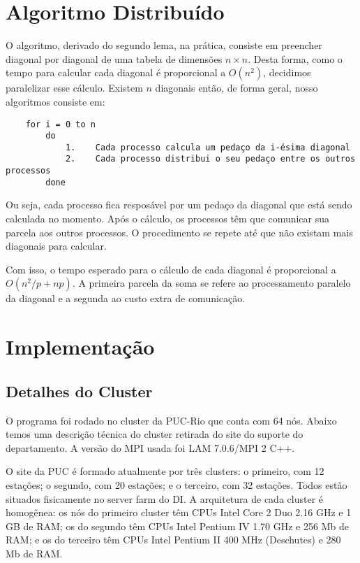 \documentclass[12pt]{article}
\begin{document}
\section{Algoritmo Distribuído}

O algoritmo, derivado do segundo lema,
na prática, consiste em preencher
diagonal por diagonal de uma tabela de dimensões
$n \times n$. Desta forma, como o tempo para calcular cada diagonal
é proporcional a $O(n^2)$, decidimos paralelizar esse cálculo.
Existem $n$ diagonais então, de forma geral, nosso
algoritmos consiste em:

\begin{verbatim}
	for i = 0 to n
		do
			1.    Cada processo calcula um pedaço da i-ésima diagonal
			2.    Cada processo distribui o seu pedaço entre os outros processos
		done
\end{verbatim}

Ou seja, cada processo fica resposável por um pedaço
da diagonal que está sendo calculada no momento. Após o cálculo,
os processos têm que comunicar sua parcela aos outros processos. 
O procedimento se repete até que não existam mais diagonais para calcular.

Com isso, o tempo esperado para o cálculo de cada diagonal é proporcional a
$O(n^2/p + np)$. A primeira parcela da soma se refere ao 
processamento paralelo da diagonal e a segunda ao custo
extra de comunicação.


\section{Implementação}

\subsection{Detalhes do Cluster}
O programa foi rodado no cluster da PUC-Rio que 
conta com 64 nós. Abaixo temos uma descrição técnica 
do cluster retirada do site do suporte do departamento.
A versão do MPI usada foi LAM 7.0.6/MPI 2 C++.

O site da PUC é formado atualmente por três clusters: o primeiro, com 12 estações;
o segundo, com 20 estações; e o terceiro, com 32 estações.
Todos estão situados fisicamente no server farm do DI.
A arquitetura de cada cluster é homogênea: os nós do primeiro cluster têm CPUs Intel Core 2 Duo 2.16 GHz e 1 GB de RAM;
os do segundo têm CPUs Intel Pentium IV 1.70 GHz e 256 Mb de RAM;
e os do terceiro têm CPUs Intel Pentium II 400 MHz (Deschutes) e 280 Mb de RAM.
\end{document}
